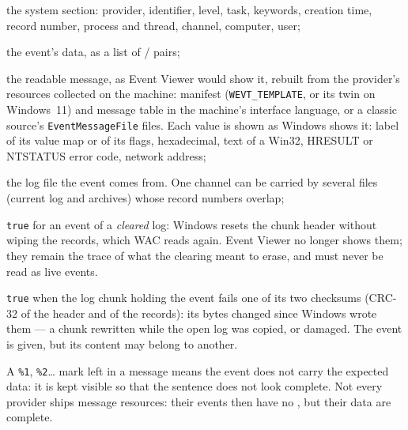 \documentclass[11pt,a4paper,oneside]{report}
\begin{document}
\begin{description}[style=nextline,leftmargin=1.2em]
  \item[\champ{EvtSystem*}] the system section: provider, identifier, level,
        task, keywords, creation time, record number, process and thread,
        channel, computer, user;
  \item[\champ{EvtEventData}] the event's data, as a list of  /
         pairs;
  \item[\champ{EvtEventMessage}] the readable message, as Event Viewer would show
        it, rebuilt from the provider's resources collected on the machine:
        manifest (\texttt{WEVT\_TEMPLATE}, or its twin
         on Windows~11) and message
        table in the machine's interface language, or a classic source's
        \texttt{EventMessageFile} files. Each value is shown as Windows shows
        it: label of its value map or of its flags, hexadecimal, text of a
        Win32, HRESULT or NTSTATUS error code, network address;
  \item[\champ{EvtSourceLog}] the log file the event comes from. One channel can
        be carried by several files (current log and archives) whose record
        numbers overlap;
  \item[\champ{EvtRecovered}] \texttt{true} for an event of a \emph{cleared}
        log: Windows resets the chunk header without wiping the records, which
        WAC reads again. Event Viewer no longer shows them; they remain the
        trace of what the clearing meant to erase, and must never be read as
        live events.
  \item[\champ{EvtChunkChecksumMismatch}] \texttt{true} when the log chunk
        holding the event fails one of its two checksums (CRC-32 of the header
        and of the records): its bytes changed since Windows wrote them --- a
        chunk rewritten while the open log was copied, or damaged. The event
        is given, but its content may belong to another.
\end{description}

\begin{note}
A \texttt{\%1}, \texttt{\%2}\ldots{} mark left in a message means the event does
not carry the expected data: it is kept visible so that the sentence does not
look complete. Not every provider ships message resources: their events then
have no , but their data are complete.
\end{note}
\end{document}
